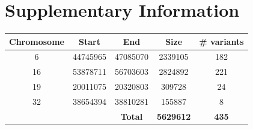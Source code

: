 \clearpage
\beginsupplement
\section{Supplementary Information}

\begin{table}[h] \centering
    \begin{tabular}{|c|c|c|c|c|} 
        \hline Chromosome & Start & End & Size & \# variants \\ \hline
        6 & 44745965 & 47085070 & 2339105 & 182 \\
        16 & 53878711 & 56703603 & 2824892 & 221 \\
        19 & 20011075 & 20320803 & 309728 & 24 \\
        32 & 38654394 & 38810281 & 155887 & 8 \\
        \hline &&   \textbf{Total}   &   \textbf{5629612}    &   \textbf{435} \\
    \hline \end{tabular}
\end{table}

